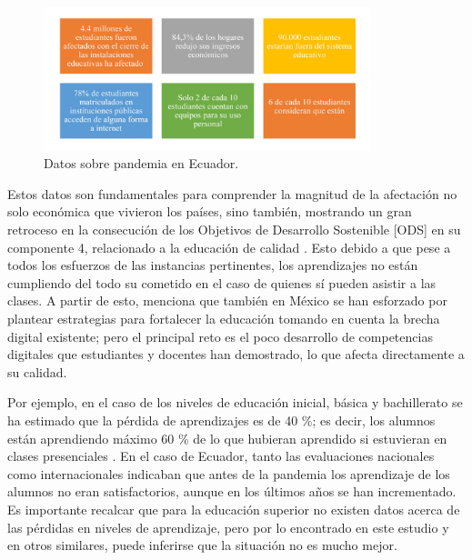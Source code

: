 \documentclass{textolivre}
\begin{document}
\begin{figure}[htbp]
 \centering
 \includegraphics[width=0.85\textwidth]{Fig01.jpg}
 \caption{Datos sobre pandemia en Ecuador.}
 \label{Fig01}
\end{figure}

Estos datos son fundamentales para comprender la magnitud de la afectación no solo económica que vivieron los países, sino también, mostrando un gran retroceso en la consecución de los Objetivos de Desarrollo Sostenible [ODS] en su componente 4, relacionado a la educación de calidad \cite{organizacion_de_las_naciones_unidas_[onu]_objetivos_2012}. Esto debido a que pese a todos los esfuerzos de las instancias pertinentes, los aprendizajes no están cumpliendo del todo su cometido en el caso de quienes sí pueden asistir a las clases. A partir de esto, \textcite{miguel_roman_educacion_2020} menciona que también en México se han esforzado por plantear estrategias para fortalecer la educación tomando en cuenta la brecha digital existente; pero el principal reto es el poco desarrollo de competencias digitales que estudiantes y docentes han demostrado, lo que afecta directamente a su calidad.

Por ejemplo, en el caso de los niveles de educación inicial, básica y bachillerato se ha estimado que la pérdida de aprendizajes es de 40 \%; es decir, los alumnos están aprendiendo máximo 60 \% de lo que hubieran aprendido si estuvieran en clases presenciales \cite{unesco_bid_2020}. En el caso de Ecuador, tanto las evaluaciones nacionales como internacionales indicaban que antes de la pandemia los aprendizaje de los alumnos no eran satisfactorios, aunque en los últimos años se han incrementado. Es importante recalcar que para la educación superior no existen datos acerca de las pérdidas en niveles de aprendizaje, pero por lo encontrado en este estudio y en otros similares, puede inferirse que la situación no es mucho mejor.
\end{document}

